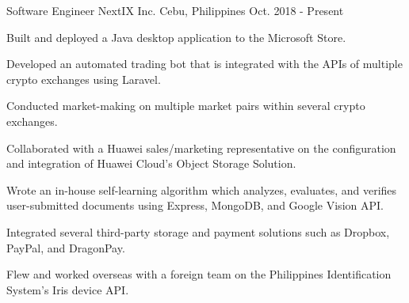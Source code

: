 

\begin{cventries}

  \cventry
    {Software Engineer} %
    {NextIX Inc.} %
    {Cebu, Philippines} %
    {Oct. 2018 - Present} %
    {
      \begin{cvitems} %
        \item {Built and deployed a Java desktop application to the Microsoft Store.}
        \item {Developed an automated trading bot that is integrated with the APIs of multiple crypto exchanges using Laravel.}
        \item {Conducted market-making on multiple market pairs within several crypto exchanges.}
        \item {Collaborated with a Huawei sales/marketing representative on the configuration and integration of Huawei Cloud's Object Storage Solution.}
        \item {Wrote an in-house self-learning algorithm which analyzes, evaluates, and verifies user-submitted documents using Express, MongoDB, and Google Vision API.}
        \item {Integrated several third-party storage and payment solutions such as Dropbox, PayPal, and DragonPay.}
        \item {Flew and worked overseas with a foreign team on the Philippines Identification System's Iris device API.}
      \end{cvitems}
    }
\end{cventries}
